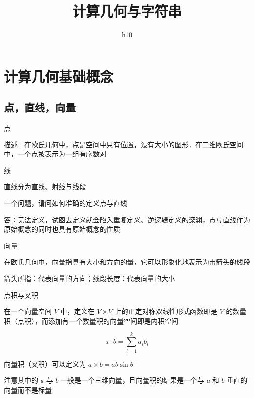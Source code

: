 \documentclass[UTF8]{beamer}
\title{计算几何与字符串}
\author{h10}
\begin{document}
	\begin{frame}

		\maketitle

	\end{frame}

	\section{计算几何基础概念}

		\subsection{点，直线，向量}

			\begin{frame}{点}

			描述：在欧氏几何中，点是空间中只有位置，没有大小的图形，在二维欧氏空间中，一个点被表示为一组有序数对

			\end{frame}

			\begin{frame}{线}

			直线分为直线、射线与线段

			\pause

			一个问题，请问如何准确的定义点与直线

			\pause

			答：无法定义，试图去定义就会陷入重复定义、逆逻辑定义的深渊，点与直线作为原始概念的同时也具有原始概念的性质

			\end{frame}

			\begin{frame}{向量}

			在欧氏几何中，向量指具有大小和方向的量，它可以形象化地表示为带箭头的线段

			箭头所指：代表向量的方向；线段长度：代表向量的大小

			\end{frame}

			\begin{frame}{点积与叉积}

			在一个向量空间 $V$ 中，定义在 $V \times V$ 上的正定对称双线性形式函数即是 $V$ 的数量积（点积），而添加有一个数量积的向量空间即是内积空间

			$$
			a \cdot b = \sum _{i=1} ^k a_i b_i
			$$

			\pause

			向量积（叉积）可以定义为 $a \times b = a b \sin \theta$

			注意其中的 $a$ 与 $b$ 一般是一个三维向量，且向量积的结果是一个与 $a$ 和 $b$ 垂直的向量而不是标量

			\end{frame}
\end{document}
